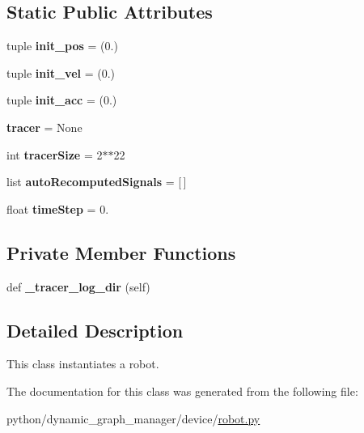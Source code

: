 \subsection*{Static Public Attributes}
\begin{DoxyCompactItemize}
\item 
\mbox{\label{classrobot_1_1Robot_a72835f96d0dfcdfe1b2d4feddfa727d2}} 
tuple {\bfseries init\+\_\+pos} = (0.)
\item 
\mbox{\label{classrobot_1_1Robot_ab50d0c91e1751573073a937ef9df4dad}} 
tuple {\bfseries init\+\_\+vel} = (0.)
\item 
\mbox{\label{classrobot_1_1Robot_ada231c72c7967d3f61083316224fa965}} 
tuple {\bfseries init\+\_\+acc} = (0.)
\item 
\mbox{\label{classrobot_1_1Robot_adda6f00aaeb6562a2cc9d682cbcdb478}} 
{\bfseries tracer} = None
\item 
\mbox{\label{classrobot_1_1Robot_a29af80c65f6ad9e61fae2cf76d81b9e0}} 
int {\bfseries tracer\+Size} = 2$\ast$$\ast$22
\item 
\mbox{\label{classrobot_1_1Robot_ab11ca34e29d7aac471df46b6fe56e7a9}} 
list {\bfseries auto\+Recomputed\+Signals} = \mbox{[}$\,$\mbox{]}
\item 
\mbox{\label{classrobot_1_1Robot_a4e690827b25920c0088890fbeea1667b}} 
float {\bfseries time\+Step} = 0.
\end{DoxyCompactItemize}
\subsection*{Private Member Functions}
\begin{DoxyCompactItemize}
\item 
\mbox{\label{classrobot_1_1Robot_a4c9fe65c4c794832943aaa7f5ca76a09}} 
def {\bfseries \+\_\+tracer\+\_\+log\+\_\+dir} (self)
\end{DoxyCompactItemize}


\subsection{Detailed Description}
This class instantiates a robot. 

The documentation for this class was generated from the following file\+:\begin{DoxyCompactItemize}
\item 
python/dynamic\+\_\+graph\+\_\+manager/device/\hyperlink{robot_8py}{robot.\+py}\end{DoxyCompactItemize}

